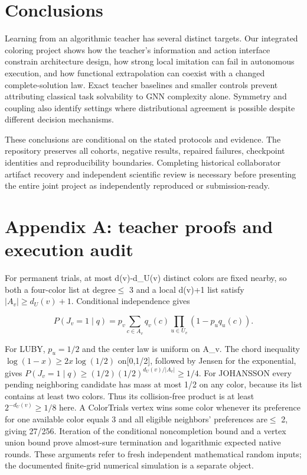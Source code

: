 \documentclass[
  11pt,
]{article}
\begin{document}
\section{Conclusions}\label{conclusions}

Learning from an algorithmic teacher has several distinct targets. Our
integrated coloring project shows how the teacher's information and
action interface constrain architecture design, how strong local
imitation can fail in autonomous execution, and how functional
extrapolation can coexist with a changed complete-solution law. Exact
teacher baselines and smaller controls prevent attributing classical
task solvability to GNN complexity alone. Symmetry and coupling also
identify settings where distributional agreement is possible despite
different decision mechanisms.

These conclusions are conditional on the stated protocols and evidence.
The repository preserves all cohorts, negative results, repaired
failures, checkpoint identities and reproducibility boundaries.
Completing historical collaborator artifact recovery and independent
scientific review is necessary before presenting the entire joint
project as independently reproduced or submission-ready.

\section{Appendix A: teacher proofs and execution
audit}\label{appendix-a-teacher-proofs-and-execution-audit}

For permanent trials, at most d(v)-d\_U(v) distinct colors are fixed
nearby, so both a four-color list at degree\(\le\) 3 and a local d(v)+1
list satisfy \(|A_v|\ge d_U(v)+1\). Conditional independence gives

\[P(J_v=1\mid q)=p_v\sum_{c\in A_v}q_v(c)
  \prod_{u\in U_v}(1-p_uq_u(c)).\]

For LUBY, \(p_u=1/2\) and the center law is uniform on A\_v. The chord
inequality \(\log(1-x)\ge2x\log(1/2)\) on{[}0,1/2{]}, followed by Jensen
for the exponential, gives
\(P(J_v=1\mid q)\ge(1/2)(1/2)^{d_U(v)/|A_v|}\ge1/4\). For JOHANSSON
every pending neighboring candidate has mass at most 1/2 on any color,
because its list contains at least two colors. Thus its collision-free
product is at least \(2^{-d_U(v)}\ge1/8\) here. A ColorTrials vertex
wins some color whenever its preference for one available color equals 3
and all eligible neighbors' preferences are\(\le\) 2, giving 27/256.
Iteration of the conditional noncompletion bound and a vertex union
bound prove almost-sure termination and logarithmic expected native
rounds. These arguments refer to fresh independent mathematical random
inputs; the documented finite-grid numerical simulation is a separate
object.
\end{document}
